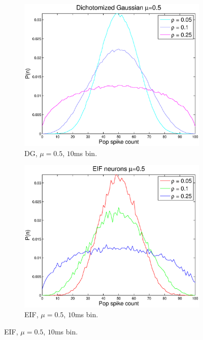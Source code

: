 \documentclass[11pt]{article}
\begin{document}
\begin{figure}[H]
	\begin{subfigure}[h]{0.5\textwidth}
	\centering
	\includegraphics[width=\textwidth]{../Figures/DG/DG_Macke_2a_mu_05}
	\caption{DG, $\mu = 0.5$, $10$ms bin.}
	\label{fig11}
	\end{subfigure}
	\begin{subfigure}[h]{0.5\textwidth}
	\centering
	\includegraphics[width=\textwidth]{../Figures/EIF/EIF_Macke_2a_mu_05}
	\caption{EIF, $\mu = 0.5$, $10$ms bin.}
	\label{fig12}
	\end{subfigure}

\end{figure}
\end{document}
